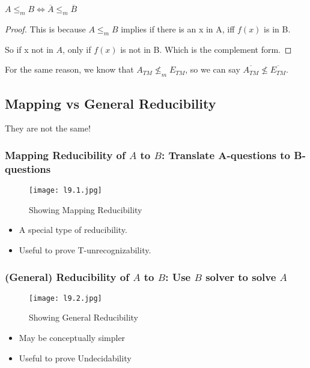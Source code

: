 \begin{theorem}
    \(A \leq_m B \iff \overline{A} \leq_m \overline{B}\)  
\end{theorem}
\begin{proof}
    This is because \(A \leq_m B\)  implies if there is an x in A, iff \(f(x)\) is in B.  

    So if x not in \(A\), only if \(f(x)\) is not in B. Which is the complement form.  
\end{proof}
\begin{corollary}
    For the same reason, we know that \(A_{TM} \not\leq_m E_{TM}\), so we can say \(\overline{A_{TM}} \not\leq \overline{E_{TM}}\).  
\end{corollary}

\subsection{Mapping vs General Reducibility}
They are not the same!

\subsubsection{Mapping Reducibility of \(A\) to \(B\): Translate A-questions to B-questions}
\begin{figure}[H]
        \centering
        \texttt{[image: l9.1.jpg]}
        \caption{Showing Mapping Reducibility}
\end{figure}
\begin{itemize}
    \item A special type of reducibility.
    \item Useful to prove T-unrecognizability.
\end{itemize}

\subsubsection{(General) Reducibility of \(A\) to \(B\): Use \(B\) solver to solve \(A\)}
\begin{figure}[H]
        \centering
        \texttt{[image: l9.2.jpg]}
        \caption{Showing General Reducibility}
\end{figure}
\begin{itemize}
    \item May be conceptually simpler
    \item Useful to prove Undecidability
\end{itemize}

